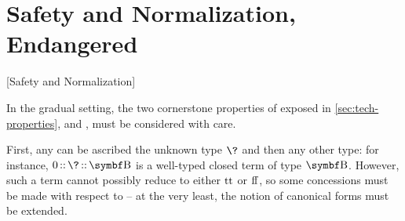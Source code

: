 \section{Safety and Normalization, Endangered}[Safety and Normalization]
\label{sec:norm-canon-endang}



In the gradual setting, the two cornerstone properties of  exposed in
\cref{sec:tech-properties}, %
and , must be considered with care.
%

First, any  can be ascribed the unknown type $\?$
and then any other type: for instance, $0 \ascop \? \ascop \Bool$ is a
well-typed closed term of type $\Bool$.%
%
%
However, such a term
cannot possibly reduce to either $\operatorname{tt}$ or $\operatorname{ff}$, so some
concessions must be made with respect to  – at the very least, the notion
of canonical forms must be extended.
%

